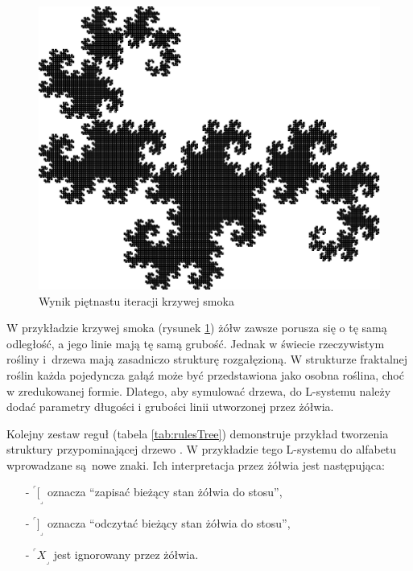 \documentclass[a4paper,twoside,12pt]{report}
\def\crnrs#1{$^\ulcorner#1_\lrcorner$}
\begin{document}
\begin{figure}[H]
	\centering
	\includegraphics[scale=0.8]{grafika/example152}
	\caption{Wynik piętnastu iteracji krzywej smoka}
	\label{fig:dragoncurve}
\end{figure}

W przykładzie krzywej smoka (rysunek \ref{fig:dragoncurve}) żółw zawsze
porusza się o tę samą odległość, a jego linie mają tę samą grubość.
Jednak w świecie rzeczywistym rośliny
i~drzewa mają zasadniczo strukturę rozgałęzioną. W strukturze fraktalnej
roślin każda pojedyncza gałąź może być przedstawiona jako osobna roślina,
choć w zredukowanej formie. Dlatego, aby symulować drzewa, do L-systemu 
należy dodać parametry długości i grubości linii utworzonej przez 
żółwia. 

Kolejny zestaw reguł (tabela \ref{tab:rulesTree}) demonstruje przykład tworzenia struktury 
przypominającej drzewo \cite{beautyofplants}.
W przykładzie tego L-systemu do alfabetu wprowadzane są~nowe znaki. 
Ich interpretacja przez żółwia jest następująca:

\begin{itemize}
	\setlength\itemsep{1em}
	\item[-] \crnrs{[} oznacza ``zapisać bieżący stan żółwia do stosu'',
	\item[-] \crnrs{]} oznacza ``odczytać bieżący stan żółwia do stosu'',
	\item[-] \crnrs{X} jest ignorowany przez żółwia.
\end{itemize}
\end{document}
